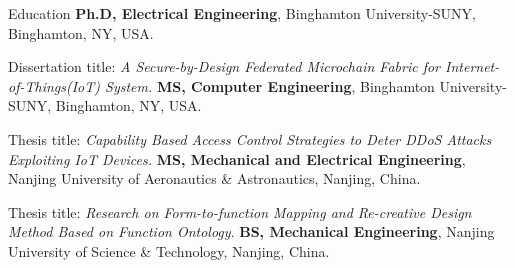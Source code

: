 \begin{rubric}{Education}
\entry*[2018 -- 2022]%
	\textbf{Ph.D, Electrical Engineering}, Binghamton University-SUNY, Binghamton, NY, USA.
	\par Dissertation title: \emph{A Secure-by-Design Federated Microchain Fabric for Internet-of-Things(IoT) System.}
%
\entry*[2016 -- 2018]%
	\textbf{MS, Computer Engineering}, Binghamton University-SUNY, Binghamton, NY, USA.
	\par Thesis title: \emph{Capability Based Access Control Strategies to Deter DDoS Attacks Exploiting IoT Devices.}
%
\entry*[2007 -- 2010]%
	\textbf{MS, Mechanical and Electrical Engineering}, Nanjing University of Aeronautics \& Astronautics, Nanjing, China.
	\par Thesis title: \emph{Research on Form-to-function Mapping and Re-creative Design Method Based on Function Ontology}.
%	
\entry*[2003 -- 2007]%
	\textbf{BS, Mechanical Engineering}, Nanjing University of Science \& Technology, Nanjing, China.
\end{rubric}